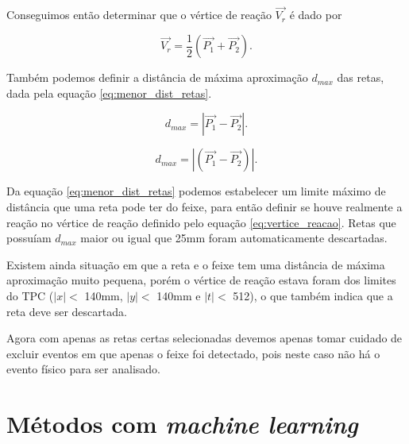 \documentclass[a4paper,12pt,oneside]{book}
\begin{document}
\par Conseguimos então determinar que o vértice de reação $\vec{V_r}$ é dado por

\begin{equation} \label{eq:vertice_reacao}
    \vec{V_r} = \frac{1}{2}(\vec{P_1} + \vec{P_2}).
\end{equation}

\par Também podemos definir a distância de máxima aproximação $d_{max}$ das retas, dada pela equação \ref{eq:menor_dist_retas}.

\begin{equation} \label{eq:menor_dist_retas}
    d_{max} = \left | \vec{P_1} - \vec{P_2} \right |.
\end{equation}


\begin{equation}
    d_{max} = \left | \left(\vec{P_1} - \vec{P_2}\right) \right |.
\end{equation}

\par Da equação \ref{eq:menor_dist_retas} podemos estabelecer um limite máximo de distância que uma reta pode ter do feixe, para então definir se houve realmente a reação no vértice de reação definido pelo equação \ref{eq:vertice_reacao}. Retas que possuíam $d_{max}$ maior ou igual que 25mm foram automaticamente descartadas.

\par Existem ainda situação em que a reta e o feixe tem uma distância de máxima aproximação muito pequena, porém o vértice de reação estava foram dos limites do TPC ($|x| < $ 140mm, $|y| < $ 140mm e $|t| < $ 512), o que também indica que a reta deve ser descartada.

\par Agora com apenas as retas certas selecionadas devemos apenas tomar cuidado de excluir eventos em que apenas o feixe foi detectado, pois neste caso não há o evento físico para ser analisado.


\section{Métodos com \textit{machine learning}}\label{sec:ml_pc}
\end{document}
